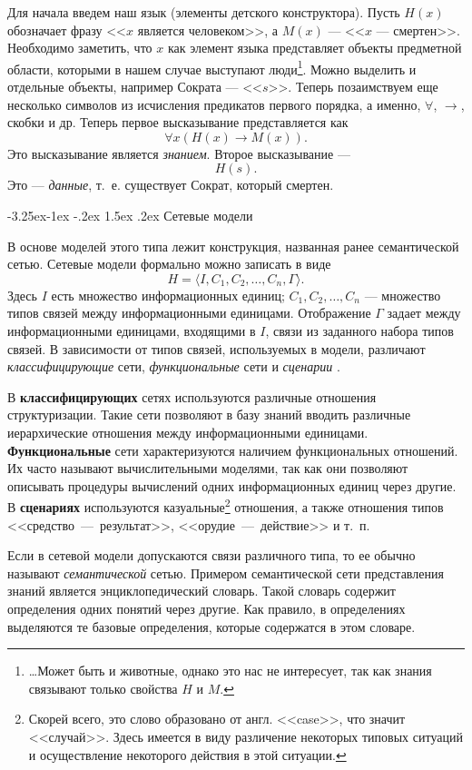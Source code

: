 \documentclass[12pt, openany, twoside]{book} %
\makeatletter
\renewcommand\subsection{\@startsection{subsection}{2}{\z@}%
                                     {-3.25ex\@plus -1ex \@minus -.2ex}%
                                     {1.5ex \@plus .2ex}%
                                     {\normalfont\normalsize\bfseries}}
\makeatother
\begin{document}
Для начала введем наш язык (элементы детского конструктора). Пусть $H(x)$ обозначает фразу <<$x$ является человеком>>, а $M(x)$ --- <<$x$ --- смертен>>. Необходимо заметить, что $x$ как элемент языка представляет объекты предметной области, которыми в нашем случае выступают люди\footnote{\ldots Может быть и животные, однако это нас не интересует, так как знания связывают только свойства $H$ и $M$.}. Можно выделить и отдельные объекты, например Сократа --- <<$s$>>. Теперь позаимствуем еще несколько символов из исчисления предикатов первого порядка, а именно, $\forall$, $\to$, скобки и др. Теперь первое высказывание представляется как
$$
\forall x \left(H(x)\to M(x)\right).
$$
Это высказывание является {\em знанием}. Второе высказывание ---
$$
H(s).
$$
Это --- \emph{данные}, т.~е. существует Сократ, который смертен.

\subsection{Сетевые модели}

В основе моделей этого типа лежит конструкция, названная ранее семантической сетью. Сетевые модели формально можно записать в виде
$$
    H=\langle I, C_1, C_2, \ldots, C_n, \Gamma\rangle.
$$
Здесь $I$ есть множество информационных единиц; $C_1, C_2, \ldots, C_n$ --- множество типов связей между информационными единицами. Отображение $\Gamma$ задает между информационными единицами, входящими в $I$, связи из заданного набора типов связей. В зависимости от типов связей, используемых в модели, различают {\em классифицирующие} сети, {\em функциональные} сети и {\em сценарии} \cite{AIDictionary}.

В {\bf классифицирующих} сетях используются различные отношения структуризации. Такие сети позволяют в базу знаний вводить различные иерархические отношения между информационными единицами. {\bf Функциональные} сети характеризуются наличием функциональных отношений. Их часто называют вычислительными моделями, так как они позволяют описывать процедуры вычислений одних информационных единиц через другие. В \textbf{сценариях} используются казуальные\footnote{Скорей всего, это слово образовано от англ. <<case>>, что значит <<случай>>. Здесь имеется в виду различение некоторых типовых ситуаций и осуществление некоторого действия в этой ситуации.} отношения, а также отношения типов <<средство~---~результат>>, <<орудие~---~действие>> и т.~п.

Если в сетевой модели допускаются связи различного типа, то ее обычно называют {\em семантической} сетью. Примером семантической сети представления знаний является энциклопедический словарь. Такой словарь содержит определения одних понятий через другие. Как правило, в определениях выделяются те базовые определения, которые содержатся в этом словаре.
\end{document}
